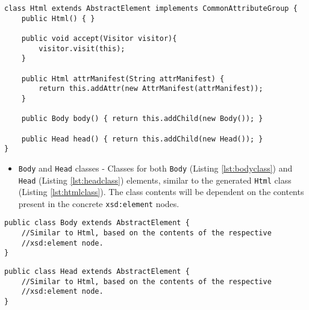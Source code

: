 
\begin{minipage}{\linewidth}
\begin{lstlisting}[caption={Generated Html Element Class},captionpos=b,label={lst:htmlclass}]
class Html extends AbstractElement implements CommonAttributeGroup {
    public Html() { }
    
    public void accept(Visitor visitor){
		visitor.visit(this);    
    }
    
    public Html attrManifest(String attrManifest) {
        return this.addAttr(new AttrManifest(attrManifest));
    }
    
    public Body body() { return this.addChild(new Body()); }
        
    public Head head() { return this.addChild(new Head()); }
}
\end{lstlisting}
\end{minipage}

\begin{itemize}
	\item \texttt{Body} and \texttt{Head} classes - Classes for both \texttt{Body} (Listing \ref{lst:bodyclass}) and \texttt{Head} (Listing \ref{lst:headclass}) elements, similar to the generated \texttt{Html} class (Listing \ref{lst:htmlclass}). The class contents will be dependent on the contents present in the concrete \texttt{xsd:element} nodes.
\end{itemize}

\bigskip

\begin{minipage}{\linewidth}
\begin{lstlisting}[caption={Generated Body Element Class},captionpos=b,label={lst:bodyclass}]
public class Body extends AbstractElement {
    //Similar to Html, based on the contents of the respective
    //xsd:element node.
}
\end{lstlisting}
\end{minipage}

\bigskip

\begin{minipage}{\linewidth}
\begin{lstlisting}[caption={Generated Head Element Class},captionpos=b,label={lst:headclass}]
public class Head extends AbstractElement {
    //Similar to Html, based on the contents of the respective 
    //xsd:element node.
}
\end{lstlisting}
\end{minipage}

